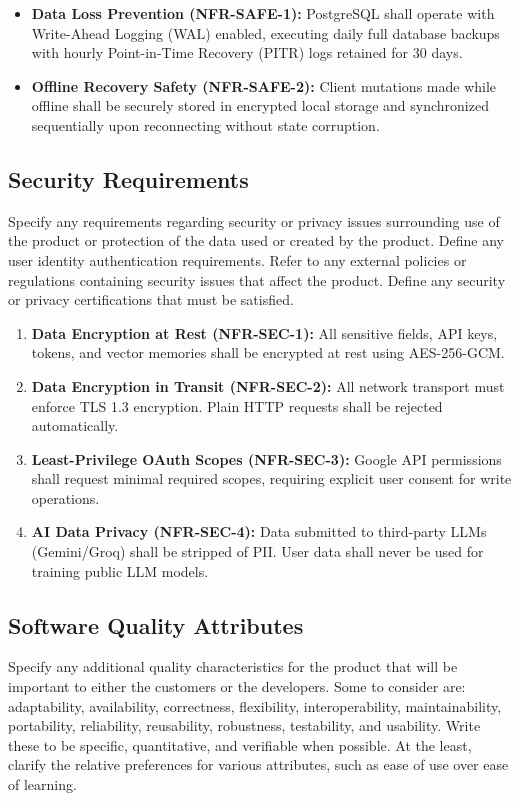 \documentclass[11pt,a4paper]{article}
\begin{document}
\begin{itemize}
    \item \textbf{Data Loss Prevention (NFR-SAFE-1):} PostgreSQL shall operate with Write-Ahead Logging (WAL) enabled, executing daily full database backups with hourly Point-in-Time Recovery (PITR) logs retained for 30 days.
    \item \textbf{Offline Recovery Safety (NFR-SAFE-2):} Client mutations made while offline shall be securely stored in encrypted local storage and synchronized sequentially upon reconnecting without state corruption.
\end{itemize}

\subsection{Security Requirements}
Specify any requirements regarding security or privacy issues surrounding use of the product or protection of the data used or created by the product. Define any user identity authentication requirements. Refer to any external policies or regulations containing security issues that affect the product. Define any security or privacy certifications that must be satisfied.

\begin{enumerate}
    \item \textbf{Data Encryption at Rest (NFR-SEC-1):} All sensitive fields, API keys, tokens, and vector memories shall be encrypted at rest using AES-256-GCM.
    \item \textbf{Data Encryption in Transit (NFR-SEC-2):} All network transport must enforce TLS 1.3 encryption. Plain HTTP requests shall be rejected automatically.
    \item \textbf{Least-Privilege OAuth Scopes (NFR-SEC-3):} Google API permissions shall request minimal required scopes, requiring explicit user consent for write operations.
    \item \textbf{AI Data Privacy (NFR-SEC-4):} Data submitted to third-party LLMs (Gemini/Groq) shall be stripped of PII. User data shall never be used for training public LLM models.
\end{enumerate}

\subsection{Software Quality Attributes}
Specify any additional quality characteristics for the product that will be important to either the customers or the developers. Some to consider are: adaptability, availability, correctness, flexibility, interoperability, maintainability, portability, reliability, reusability, robustness, testability, and usability. Write these to be specific, quantitative, and verifiable when possible. At the least, clarify the relative preferences for various attributes, such as ease of use over ease of learning.
\end{document}
